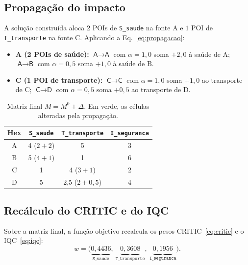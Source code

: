\documentclass[11pt,a4paper]{article}
\newcommand{\hex}[1]{\textsf{#1}}
\begin{document}
\subsection{Propagação do impacto}

A solução construída aloca $2$ POIs de \texttt{S\_saude} na fonte \hex{A} e
$1$ POI de \texttt{T\_transporte} na fonte \hex{C}. Aplicando a
Eq.~\eqref{eq:propagacao}:

\begin{itemize}\setlength\itemsep{1pt}
\item \textbf{\hex{A} (2 POIs de saúde):} $\hex{A}\!\to\!\hex{A}$ com
$\alpha=1{,}0$ soma $+2{,}0$ à saúde de \hex{A};
$\hex{A}\!\to\!\hex{B}$ com $\alpha=0{,}5$ soma $+1{,}0$ à saúde de \hex{B}.
\item \textbf{\hex{C} (1 POI de transporte):} $\hex{C}\!\to\!\hex{C}$ com
$\alpha=1{,}0$ soma $+1{,}0$ ao transporte de \hex{C};
$\hex{C}\!\to\!\hex{D}$ com $\alpha=0{,}5$ soma $+0{,}5$ ao transporte de \hex{D}.
\end{itemize}

\begin{table}[ht]
\centering
\caption{Matriz final $M = M^0 + \Delta$. Em \colorbox{cellchg}{verde}, as
células alteradas pela propagação.}
\label{tab:final}
\begin{tabular}{@{}c ccc@{}}
\toprule
Hex & \texttt{S\_saude} & \texttt{T\_transporte} & \texttt{I\_seguranca} \\
\midrule
\hex{A} & \cellcolor{cellchg}4 \;\scriptsize($2{+}2$) & 5 & 3 \\
\hex{B} & \cellcolor{cellchg}5 \;\scriptsize($4{+}1$) & 1 & 6 \\
\hex{C} & 1 & \cellcolor{cellchg}4 \;\scriptsize($3{+}1$) & 2 \\
\hex{D} & 5 & \cellcolor{cellchg}2{,}5 \;\scriptsize($2{+}0{,}5$) & 4 \\
\bottomrule
\end{tabular}
\end{table}

\subsection{Recálculo do CRITIC e do IQC}

Sobre a matriz final, a função objetivo recalcula os pesos
CRITIC~\eqref{eq:critic} e o IQC~\eqref{eq:iqc}:
\begin{equation*}
w = \bigl(\underbrace{0{,}4436}_{\texttt{S\_saude}},\
          \underbrace{0{,}3608}_{\texttt{T\_transporte}},\
          \underbrace{0{,}1956}_{\texttt{I\_seguranca}}\bigr).
\end{equation*}
\end{document}
